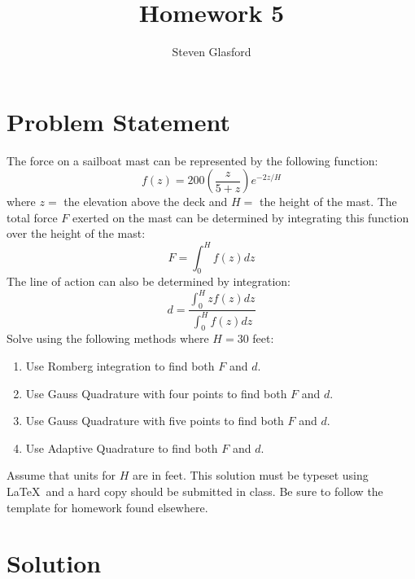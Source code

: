 \documentclass[11pt]{article}
\title{Homework 5}
\author{Steven Glasford}
\date{\parbox{\linewidth}{\centering%
    \today\endgraf\medskip
    Numerical Analysis\endgraf\medskip
    MATH-373}}
\begin{document}
\maketitle
\pagebreak

\section{Problem Statement}

    The force on a sailboat mast can be represented by the following function: 
    $$f(z) = 200\left(\frac{z}{5+z}\right)e^{-2z/H}$$ 
    where $z=$ the elevation above the deck and $H=$ the height of the mast. The total force $F$ exerted on the mast can be determined by integrating this function over the height of the mast: 
    $$F = \int_{0}^{H} f(z) dz$$
    The line of action can also be determined by integration: 
    $$d = \frac{\int_{0}^{H} z f(z) dz}{\int_{0}^{H} f(z) dz}$$
    Solve using the following methods where $H=30$ feet:
    
	\begin{enumerate}
	
	\item\label{part1}  Use Romberg integration to find both $F$ and $d$.
	
	\item\label{part2}  Use Gauss Quadrature with four points to find both $F$ and $d$.
	
	\item\label{part3}  Use Gauss Quadrature with five points to find both $F$ and $d$.
	
	\item\label{part4}  Use Adaptive Quadrature to find both $F$ and $d$. 
	
	\end{enumerate}
    Assume that units for $H$ are in feet.  This solution must be typeset using \LaTeX\ and a hard copy should be submitted in class.  Be sure to follow the template for homework found elsewhere.


\section{Solution}
\end{document}

